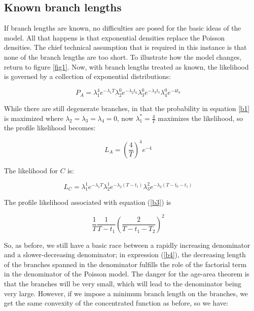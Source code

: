 \documentclass[11pt]{article}
\begin{document}
 


\subsection{Known branch lengths}

If branch lengths are known, no difficulties are posed for the basic ideas of the model. All that happens is that exponential densities replace the Poisson densities. The chief technical assumption that is required in this instance is that none of the branch lengths are too short. To illustrate how the model changes, return to figure  \ref{fig1}. Now, with branch lengths treated as known, the likelihood is governed by a collection of exponential distributions:

\begin{equation} \label{b1}
P_A = \lambda_1^4e^{-\lambda_1T}\lambda_2^0e^{-\lambda_2t_6}\lambda_3^0e^{-\lambda_3t_7}\lambda_4 ^0e^{-4t_8}
\end{equation} 

While there are still degenerate branches, in that the probability in equation \ref{b1} is maximized where $\lambda_2=\lambda_3=\lambda_4=0$, now $\lambda_1^*=\frac{4}{T}$ maximizes the likelihood, so the profile likelihood becomes:

\begin{equation} \label{b2}
L_A=\left(\frac{4}{T}\right)^4e^{-4}
\end{equation}

The likelihood for $C$ is:

\begin{equation} \label{b3}
L_{C}=\lambda_1^1e^{-\lambda_1T}\lambda_2^1e^{-\lambda_2(T-t_1)}
\lambda_3^2e^{-\lambda_3(T-t_0-t_1)}
\end{equation}

The profile likelihood associated with equation (\ref{b3}) is 

\begin{equation} \label{b4}
\frac{1}{T}\frac{1}{T-t_1}\left(\frac{2}{T-t_1-T_2}\right)^2
\end{equation}

So, as before, we still have a basic race between a rapidly increasing denominator and a slower-decreasing denominator; in expression (\ref{b4}), the decreasing length of the branches spanned in the denominator fulfills the role of the factorial term in the denominator of the Poisson model. The danger for the age-area theorem is that the branches will be very small, which will lead to the denominator being very large. However, if we impose a minimum branch length on the branches, we get the same convexity of the concentrated function as before, so we have:
\end{document}

